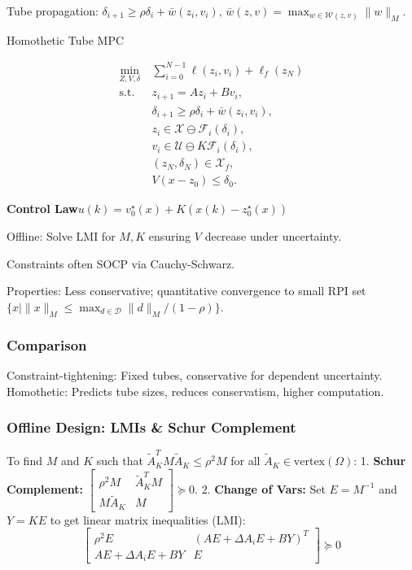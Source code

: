 Tube propagation: $\delta_{i+1} \geq \rho \delta_i + \bar{w}(z_i,
v_i)$, $\bar{w}(z,v) = \max_{w \in \mathcal{W}(z,v)} \|w\|_M$.

\begin{sstTitleBox}[RoyalBlue]{Homothetic Tube MPC}
  \begin{sstOnlyFrame}
    \[
      \begin{aligned}
        \min_{Z,V,\delta} \         & \sum_{i=0}^{N-1} \ell(z_i, v_i)
        + \ell_f(z_N) \\
        \mathrm{s.t.}\  & z_{i+1} = Az_i + Bv_i, \\
        & \delta_{i+1} \geq \rho \delta_i + \bar{w}(z_i, v_i), \\
        & z_i \in \mathcal{X} \ominus \mathcal{F}_i(\delta_i), \\
        & v_i \in \mathcal{U} \ominus K \mathcal{F}_i(\delta_i), \\
        & (z_N, \delta_N) \in \mathcal{X}_f, \\
        & V(x - z_0) \leq \delta_0.
    \end{aligned}\]
  \end{sstOnlyFrame}
  \begin{sstOnlyFrame}
    \textbf{Control Law}\quad $u(k) = v_0^\star(x) + K(x(k) - z_0^\star(x))$
  \end{sstOnlyFrame}
\end{sstTitleBox}

Offline: Solve LMI for $M, K$ ensuring $V$ decrease under uncertainty.

Constraints often SOCP via Cauchy-Schwarz.

Properties: Less conservative; quantitative convergence to small RPI
set $\{x \mid \|x\|_M \leq \max_{d\in\mathcal{D}} \|d\|_M / (1-\rho)\}$.

\subsubsection{Comparison}
Constraint-tightening: Fixed tubes, conservative for dependent uncertainty.
Homothetic: Predicts tube sizes, reduces conservatism, higher computation.

\subsubsection{Offline Design: LMIs \& Schur Complement}

To find $M$ and $K$ such that $\tilde{A}_K^T M \tilde{A}_K \le \rho^2
M$ for all $\tilde{A}_K \in \text{vertex}(\Omega)$:
1. \textbf{Schur Complement:} $
\begin{bmatrix} \rho^2 M & \tilde{A}_K^T M \\ M \tilde{A}_K & M
\end{bmatrix} \succeq 0$.
2. \textbf{Change of Vars:} Set $E = M^{-1}$ and $Y = KE$ to get
linear matrix inequalities (LMI):
\[
  \begin{bmatrix} \rho^2 E & (AE + \Delta A_i E + BY)^T \\ AE +
    \Delta A_i E + BY & E
  \end{bmatrix} \succeq 0
\]

